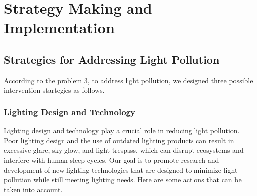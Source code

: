 \MinParskip{}

\section{Strategy Making and Implementation}

\subsection{Strategies for Addressing Light Pollution}

According to the problem 3, to address light pollution, we designed three possible intervention startegies as follows.

\subsubsection{Lighting Design and Technology}

Lighting design and technology play a crucial role in reducing light pollution. Poor lighting design and the use of outdated lighting products can result in excessive glare, sky glow, and light trespass, which can disrupt ecosystems and interfere with human sleep cycles. Our goal is to promote research and development of new lighting technologies that are designed to minimize light pollution while still meeting lighting needs. Here are some actions that can be taken into account.

